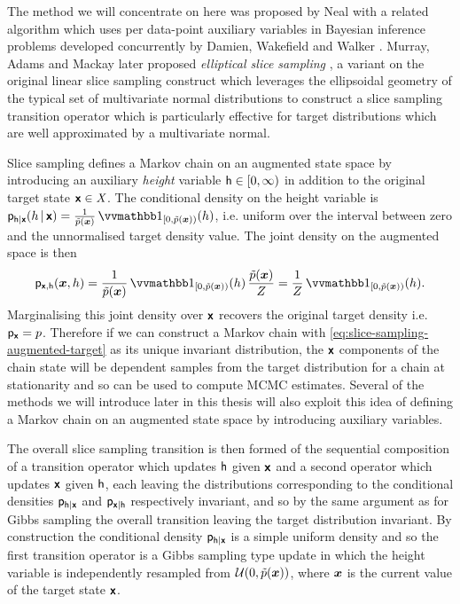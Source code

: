 The method we will concentrate on here was proposed by Neal \citep{neal1997markov,neal2003slice} with a related algorithm which uses per data-point auxiliary variables in Bayesian inference problems developed concurrently by Damien, Wakefield and Walker \citep{damien1999gibbs}. Murray, Adams and Mackay later proposed \emph{elliptical slice sampling} \citep{murray2010elliptical}, a variant on the original linear slice sampling construct which leverages the ellipsoidal geometry of the typical set of multivariate normal distributions to construct a slice sampling transition operator which is particularly effective for target distributions which are well approximated by a multivariate normal.

Slice sampling defines a Markov chain on an augmented state space by introducing an auxiliary \emph{height} variable $\mathsf{h} \in [0, \infty)$ in addition to the original target state $\boldsymbol{\mathsf{x}} \in \mathit{X}$. The conditional density on the height variable is $\pden{\rvar{h}|\rvct{x}}(h\gvn\rvct{x}) = \frac{1}{\utgtdens(\vct{x})} \ind{[0,\utgtdens(\vct{x}))}(h) $, i.e. uniform over the interval between zero and the unnormalised target density value. The joint density on the augmented space is then
\begin{equation}\label{eq:slice-sampling-augmented-target}
  \pden{\rvct{x},\rvar{h}}(\vct{x},h) = 
  \frac{1}{\utgtdens(\vct{x})} \ind{[0,\utgtdens(\vct{x}))}(h)\, \frac{\utgtdens(\vct{x})}{Z} =
  \frac{1}{Z} \ind{[0,\utgtdens(\vct{x}))}(h).
\end{equation}
Marginalising this joint density over $\boldsymbol{\mathsf{x}}$ recovers the original target density i.e. $\mathsf{p}_{\boldsymbol{\mathsf{x}}} = p$. Therefore if we can construct a Markov chain with \eqref{eq:slice-sampling-augmented-target} as its unique invariant distribution, the $\boldsymbol{\mathsf{x}}$ components of the chain state will be dependent samples from the target distribution for a chain at stationarity and so can be used to compute \ac{MCMC} estimates. Several of the methods we will introduce later in this thesis will also exploit this idea of defining a Markov chain on an augmented state space by introducing auxiliary variables.

The overall slice sampling transition is then formed of the sequential composition of a transition operator which updates $\mathsf{h}$ given $\boldsymbol{\mathsf{x}}$ and a second operator which updates $\boldsymbol{\mathsf{x}}$ given $\mathsf{h}$, each leaving the distributions corresponding to the conditional densities $\mathsf{p}_{\mathsf{h}|\boldsymbol{\mathsf{x}}}$ and $\mathsf{p}_{\boldsymbol{\mathsf{x}}|\mathsf{h}}$ respectively invariant, and so by the same argument as for Gibbs sampling the overall transition leaving the target distribution invariant. By construction the conditional density $\mathsf{p}_{\mathsf{h}|\boldsymbol{\mathsf{x}}}$ is a simple uniform density and so the first transition operator is a Gibbs sampling type update in which the height variable is independently resampled from $\mathcal{U}\lpa 0, \utgtdens(\vct{x})\rpa$, where $\boldsymbol{x}$ is the current value of the target state $\boldsymbol{\mathsf{x}}$.

